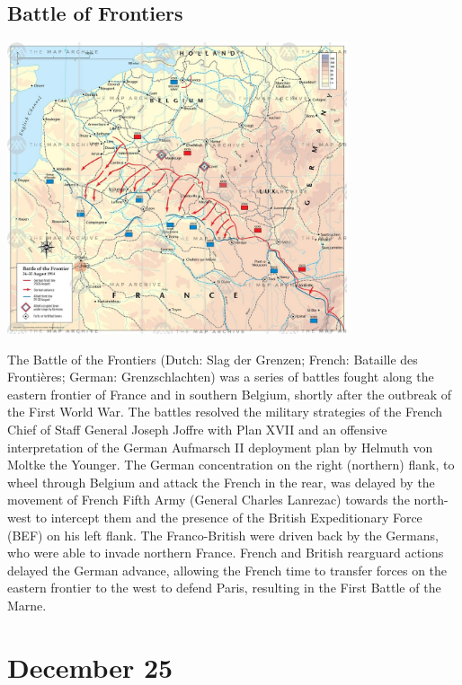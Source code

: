 \documentclass[11pt]{report}
\begin{document}
\subsection{Battle of Frontiers}
\vspace{2mm}\begin{center}\includegraphics[width=10cm]{./img/battleOfFrontier.jpg}\end{center}
The Battle of the Frontiers (Dutch: Slag der Grenzen; French: Bataille des Frontières; German: Grenzschlachten) was a series of battles fought along the eastern frontier of France and in southern Belgium, shortly after the outbreak of the First World War. The battles resolved the military strategies of the French Chief of Staff General Joseph Joffre with Plan XVII and an offensive interpretation of the German Aufmarsch II deployment plan by Helmuth von Moltke the Younger. The German concentration on the right (northern) flank, to wheel through Belgium and attack the French in the rear, was delayed by the movement of French Fifth Army (General Charles Lanrezac) towards the north-west to intercept them and the presence of the British Expeditionary Force (BEF) on his left flank. The Franco-British were driven back by the Germans, who were able to invade northern France. French and British rearguard actions delayed the German advance, allowing the French time to transfer forces on the eastern frontier to the west to defend Paris, resulting in the First Battle of the Marne.
\section{December 25}
\end{document}
